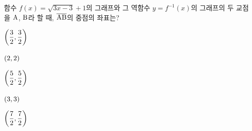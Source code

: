 함수 $f(x)=\sqrt{3x-3}+1$의 그래프와 그 역함수 $y=f^{-1}(x)$의 그래프의 두 교점을 $\mathrm{A}$, $\mathrm{B}$라 할 때, $\overline{\mathrm{AB}}$의 중점의 좌표는?
\begin{choices32}{\rule[-3ex]{0pt}{8ex}$\left(\dfrac{3}{2}{,}\mkern3mu\mathopen{}\dfrac{3}{2}\right)$}{\rule[-3ex]{0pt}{8ex}$(2{,}\mkern3mu\mathopen{}2)$}{\rule[-3ex]{0pt}{8ex}$\left(\dfrac{5}{2}{,}\mkern3mu\mathopen{}\dfrac{5}{2}\right)$}{\rule[-3ex]{0pt}{8ex}$(3{,}\mkern3mu\mathopen{}3)$}{\rule[-3ex]{0pt}{8ex}$\left(\dfrac{7}{2}{,}\mkern3mu\mathopen{}\dfrac{7}{2}\right)$}\end{choices32}

